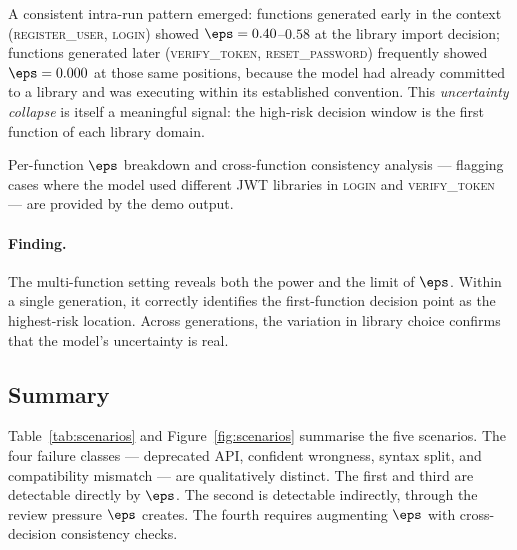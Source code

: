 A consistent intra-run pattern emerged: functions generated early in the
context (\textsc{register\_user}, \textsc{login}) showed $\eps = 0.40$--$0.58$
at the library import decision; functions generated later
(\textsc{verify\_token}, \textsc{reset\_password}) frequently showed
$\eps = 0.000$ at those same positions, because the model had already
committed to a library and was executing within its established convention.
This \emph{uncertainty collapse} is itself a meaningful signal: the
high-risk decision window is the first function of each library domain.

Per-function $\eps$ breakdown and cross-function consistency analysis ---
flagging cases where the model used different JWT libraries in
\textsc{login} and \textsc{verify\_token} --- are provided by the demo
output.

\paragraph{Finding.}
The multi-function setting reveals both the power and the limit of $\eps$.
Within a single generation, it correctly identifies the first-function
decision point as the highest-risk location. Across generations, the
variation in library choice confirms that the model's uncertainty is real.

\subsection{Summary}

Table~\ref{tab:scenarios} and Figure~\ref{fig:scenarios} summarise the
five scenarios. The four failure classes --- deprecated API, confident wrongness, syntax
split, and compatibility mismatch --- are qualitatively distinct.
The first and third are detectable directly by $\eps$. The second is
detectable indirectly, through the review pressure $\eps$ creates. The
fourth requires augmenting $\eps$ with cross-decision consistency checks.

